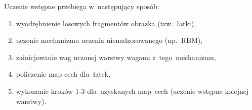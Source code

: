 Uczenie wstępne przebiega w~następujący sposób:
\begin{enumerate}
  \item wyodrębnienie losowych fragmentów obrazka (tzw.~łatki),
  \item uczenie mechanizmu uczenia nienadzorowanego (np.~RBM),
  \item zainicjowanie wag uczonej warstwy wagami z~tego~mechanizmu,
  \item policzenie map cech dla~łatek,
  \item wykonanie kroków 1-3 dla~uzyskanych map~cech (uczenie wstępne kolejnej warstwy).
\end{enumerate}
